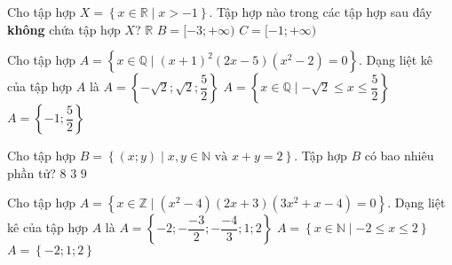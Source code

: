\begin{ex}%
	Cho tập hợp $X = \left\{x \in \mathbb{R} \mid x > -1 \right\}.$ Tập hợp nào trong các tập hợp sau đây {\bf không} chứa tập hợp $X$?
	\choice{\True $A = [-3;7) $}
	{$ \mathbb{R}$}
	{$ B = [-3;+\infty )$}
	{$ C = [-1; +\infty)  $}
\end{ex}

\begin{ex}%
	Cho tập hợp $A = \left\{x \in \mathbb{Q} \mid (x+1)^2(2x-5)(x^2-2) = 0\right\}$. Dạng liệt kê của tập hợp $A$ là
	{$A  = \left\{- \sqrt{2} ; \sqrt{2}; \dfrac{5}{2}\right\} $}
	{$A  = \left\{x \in \mathbb{Q} \mid -\sqrt{2} \le x \le \dfrac{5}{2} \right\} $}
	{\True $A  = \left\{ -1 ; \dfrac{5}{2}\right\} $}
\end{ex}

\begin{ex}%
	Cho tập hợp $B = \left\{(x;y) \mid  x,y \in \mathbb{N}  \text{ và } x+y= 2\right\}$. Tập hợp $B$ có bao nhiêu phần tử?
	{$8$}
	{\True $3$}
	{$9$}
\end{ex}

\begin{ex}%
	Cho tập hợp $A = \left\{x \in \mathbb{Z} \mid (x^2-4)(2x+3)(3x^2+x-4) = 0\right\}$. Dạng liệt kê của tập hợp $A$ là
	{$A  = \left\{-2;-\dfrac{-3}{2};-\dfrac{-4}{3};1;2\right\} $}
	{$A  = \left\{x \in \mathbb{N} \mid -2 \le x \le 2 \right\} $}
	{\True $A  = \left\{-2;1;2\right\} $}
\end{ex}

